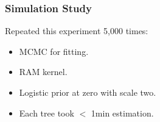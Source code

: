 \documentclass[aspectratio=169, 9pt]{beamer}
\begin{document}
\begin{frame}
\frametitle{Simulation Study}

\begin{minipage}[c]{.40\linewidth}
Repeated this experiment 5,000 times:
    \begin{itemize}
        \item MCMC for fitting.
        \item RAM kernel.
        \item Logistic prior at zero with scale two.
        \item Each tree took $<$ 1min estimation.
    \end{itemize}
\end{minipage}\hfill
\begin{minipage}[c]{.59\linewidth}
\end{minipage}
	
\end{frame}
\end{document}
